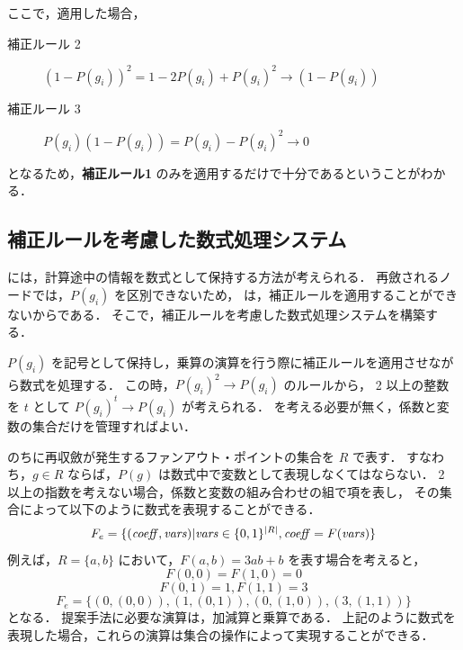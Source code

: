 ここで，適用した場合，
\begin{description}
  \item[補正ルール 2] $(1 - P(g_i))^2 = 1 - 2 P(g_i) + P(g_i)^2 \rightarrow (1 - P(g_i))$
  \item[補正ルール 3] $P(g_i) (1 - P(g_i)) = P(g_i) - P(g_i)^2 \rightarrow 0$
\end{description}
となるため，{\bf 補正ルール1} のみを適用するだけで十分であるということがわかる．

\subsection{補正ルールを考慮した数式処理システム}

には，計算途中の情報を数式として保持する方法が考えられる．
再斂されるノードでは，$P(g_i)$ を区別できないため，
は，補正ルールを適用することができないからである．
そこで，補正ルールを考慮した数式処理システムを構築する．

$P(g_i)$ を記号として保持し，乗算の演算を行う際に補正ルールを適用させながら数式を処理する．
この時，$P(g_i)^2 \rightarrow P(g_i)$ のルールから，
2 以上の整数を $t$ として $P(g_i)^t \rightarrow P(g_i)$ が考えられる．
を考える必要が無く，係数と変数の集合だけを管理すればよい．

のちに再収斂が発生するファンアウト・ポイントの集合を $R$ で表す．
すなわち，$g \in R$ ならば，$P(g)$ は数式中で変数として表現しなくてはならない．
2 以上の指数を考えない場合，係数と変数の組み合わせの組で項を表し，
その集合によって以下のように数式を表現することができる．
\begin{eqnarray}
  F_e = \{ ({\it coeff}, {\it vars}) | {\it vars} \in \{0, 1\}^{|R|}, {\it coeff} = F({\it vars}) \}
\end{eqnarray}
例えば，$R = \{a, b\}$ において，$F(a, b) = 3ab + b$ を表す場合を考えると，
\[ F(0, 0) = F(1, 0) = 0 \]
\[ F(0, 1) = 1, F(1, 1) = 3 \]
\[ F_e = \{ (0, (0, 0)), (1, (0, 1)), (0, (1, 0)), (3, (1, 1)) \} \]
となる．
提案手法に必要な演算は，加減算と乗算である．
上記のように数式を表現した場合，これらの演算は集合の操作によって実現することができる．

